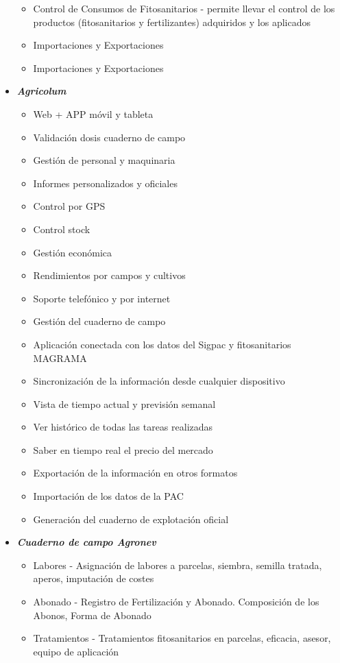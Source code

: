 \begin{itemize}
\begin{itemize}
\item Control de Consumos de Fitosanitarios - permite llevar el control de los productos (fitosanitarios y fertilizantes) adquiridos y los aplicados
\item Importaciones y Exportaciones 
\item Importaciones y Exportaciones 
\end{itemize}
\item \textbf{\textit{Agricolum}} \cite{agricolum}
\begin{itemize}
\item Web + APP móvil y tableta
\item Validación dosis cuaderno de campo
\item Gestión de personal y maquinaria
\item Informes personalizados y oficiales
\item Control por GPS
\item Control stock
\item Gestión económica
\item Rendimientos por campos y cultivos
\item Soporte telefónico y por internet
\item Gestión del cuaderno de campo
\item Aplicación conectada con los datos del Sigpac y fitosanitarios MAGRAMA
\item Sincronización de la información desde cualquier dispositivo
\item Vista de tiempo actual y previsión semanal
\item Ver histórico de todas las tareas realizadas
\item Saber en tiempo real el precio del mercado
\item Exportación de la información en otros formatos
\item Importación de los datos de la PAC
\item Generación del cuaderno de explotación oficial
\end{itemize}
\item \textbf{\textit{Cuaderno de campo Agronev}} \cite{agronev}
\begin{itemize}
\item Labores - Asignación de labores a parcelas, siembra, semilla tratada, aperos, imputación de costes
\item Abonado - Registro de Fertilización y Abonado. Composición de los Abonos, Forma de Abonado
\item Tratamientos - Tratamientos fitosanitarios en parcelas, eficacia, asesor, equipo de aplicación

\end{itemize}
\end{itemize}
